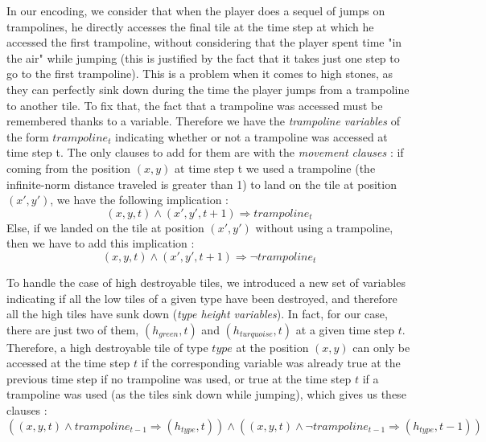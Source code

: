 \documentclass[a4paper, 12pt, titlepage]{article}
\begin{document}
In our encoding, we consider that when the player does a sequel of jumps on
trampolines, he directly accesses the final tile at the time step at which he
accessed the first trampoline, without considering that the player spent time
"in the air" while jumping (this is justified by the fact that it takes just one
step to go to the first trampoline). This is a problem when it comes to high
stones, as they can perfectly sink down during the time the player jumps from a
trampoline to another tile. To fix that, the fact that a trampoline was accessed
must be remembered thanks to a variable. Therefore we have the {\em trampoline
variables} of the form $trampoline_t$ indicating whether or not a trampoline was
accessed at time step t. The only clauses to add for them are with the
{\em movement clauses} : if coming from the position $(x, y)$ at time step t we
used a trampoline (the infinite-norm distance traveled is greater than 1) to
land on the tile at position $(x', y')$, we have the following implication :
\begin{equation}
(x, y, t) \wedge (x', y', t+1) \Rightarrow trampoline_t
\end{equation}
Else, if we landed on the tile at position $(x', y')$ without using a
trampoline, then we have to add this implication :
\begin{equation}
(x, y, t) \wedge (x', y', t+1) \Rightarrow \neg trampoline_t
\end{equation}

To handle the case of high destroyable tiles, we introduced a new set of
variables indicating if all the low tiles of a given type have been destroyed,
and therefore all the high tiles have sunk down ({\em type height variables}).
In fact, for our case, there are just two of them, $(h_{green}, t)$ and
$(h_{turquoise}, t)$ at a given time step $t$. Therefore, a high destroyable
tile of type $type$ at the position $(x, y)$ can only be accessed at the
time step $t$ if the corresponding variable was already true at the previous
time step if no trampoline was used, or true at the time step $t$ if a trampoline
was used (as the tiles sink down while jumping), which gives us these clauses :
\begin{equation}
((x, y, t) \wedge trampoline_{t-1} \Rightarrow (h_{type}, t))
\wedge
((x, y, t) \wedge \neg trampoline_{t-1} \Rightarrow (h_{type}, t-1))
\end{equation}
\end{document}
